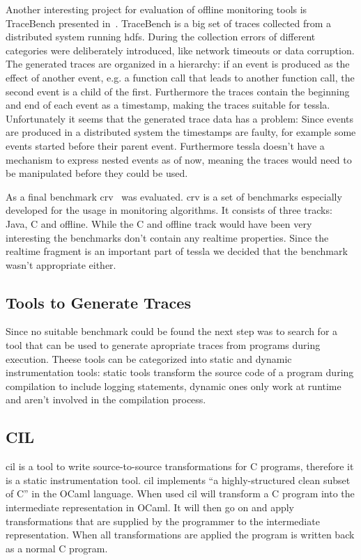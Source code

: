 Another interesting project for evaluation of offline monitoring tools is TraceBench presented in~\cite{Zhou2014}.
TraceBench is a big set of traces collected from a distributed system running \gls{hdfs}.
During the collection errors of different categories were deliberately introduced, like network timeouts or data corruption.
The generated traces are organized in a hierarchy: if an event is produced as the effect of another event, e.g. a function call that leads to another function call, the second event is a child of the first.
Furthermore the traces contain the beginning and end of each event as a timestamp, making the traces suitable for \gls{tessla}.
Unfortunately it seems that the generated trace data has a problem: Since events are produced in a distributed system the timestamps are faulty, for example some events started before their parent event.
Furthermore \gls{tessla} doesn't have a mechanism to express nested events as of now, meaning the traces would need to be manipulated before they could be used.

As a final benchmark \gls{crv}~\citep{Reger2016} was evaluated.
\Gls{crv} is a set of benchmarks especially developed for the usage in monitoring algorithms.
It consists of three tracks: Java, C and offline.
While the C and offline track would have been very interesting the benchmarks don't contain any realtime properties.
Since the realtime fragment is an important part of \gls{tessla} we decided that the benchmark wasn't appropriate either.

\subsection{Tools to Generate Traces}

Since no suitable benchmark could be found the next step was to search for a tool that can be used to generate apropriate traces from programs during execution.
Theese tools can be categorized into static and dynamic instrumentation tools: static tools transform the source code of a program during compilation to include logging statements, dynamic ones only work at runtime and aren't involved in the compilation process.

\subsection{CIL}

\Gls{cil}\cite{Necula2002} is a tool to write source-to-source transformations for C programs, therefore it is a static instrumentation tool.
\Gls{cil} implements ``a highly-structured clean subset of C'' in the OCaml language.
When used \gls{cil} will transform a C program into the intermediate representation in OCaml.
It will then go on and apply transformations that are supplied by the programmer to the intermediate representation.
When all transformations are applied the program is written back as a normal C program.

